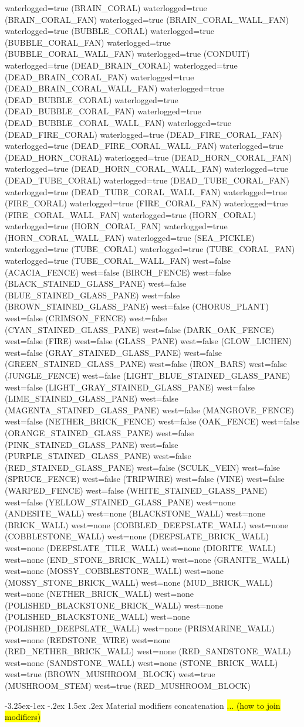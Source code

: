 \documentclass[11pt]{article}
\makeatletter
\renewcommand\subsection{\@startsection{subsection}{2}{\z@}%
                                         {-3.25ex\@plus -1ex \@minus -.2ex}%
                                         {1.5ex \@plus .2ex}%
                                         {\normalfont\fontfamily{phv}\fontsize{14}{17}\bfseries}}
\newcommand\myworries[1]{\sethlcolor{red}\hl{#1}}
\makeatother
\begin{document}
waterlogged=true (BRAIN_CORAL)
waterlogged=true (BRAIN_CORAL_FAN)
waterlogged=true (BRAIN_CORAL_WALL_FAN)
waterlogged=true (BUBBLE_CORAL)
waterlogged=true (BUBBLE_CORAL_FAN)
waterlogged=true (BUBBLE_CORAL_WALL_FAN)
waterlogged=true (CONDUIT)
waterlogged=true (DEAD_BRAIN_CORAL)
waterlogged=true (DEAD_BRAIN_CORAL_FAN)
waterlogged=true (DEAD_BRAIN_CORAL_WALL_FAN)
waterlogged=true (DEAD_BUBBLE_CORAL)
waterlogged=true (DEAD_BUBBLE_CORAL_FAN)
waterlogged=true (DEAD_BUBBLE_CORAL_WALL_FAN)
waterlogged=true (DEAD_FIRE_CORAL)
waterlogged=true (DEAD_FIRE_CORAL_FAN)
waterlogged=true (DEAD_FIRE_CORAL_WALL_FAN)
waterlogged=true (DEAD_HORN_CORAL)
waterlogged=true (DEAD_HORN_CORAL_FAN)
waterlogged=true (DEAD_HORN_CORAL_WALL_FAN)
waterlogged=true (DEAD_TUBE_CORAL)
waterlogged=true (DEAD_TUBE_CORAL_FAN)
waterlogged=true (DEAD_TUBE_CORAL_WALL_FAN)
waterlogged=true (FIRE_CORAL)
waterlogged=true (FIRE_CORAL_FAN)
waterlogged=true (FIRE_CORAL_WALL_FAN)
waterlogged=true (HORN_CORAL)
waterlogged=true (HORN_CORAL_FAN)
waterlogged=true (HORN_CORAL_WALL_FAN)
waterlogged=true (SEA_PICKLE)
waterlogged=true (TUBE_CORAL)
waterlogged=true (TUBE_CORAL_FAN)
waterlogged=true (TUBE_CORAL_WALL_FAN)
west=false (ACACIA_FENCE)
west=false (BIRCH_FENCE)
west=false (BLACK_STAINED_GLASS_PANE)
west=false (BLUE_STAINED_GLASS_PANE)
west=false (BROWN_STAINED_GLASS_PANE)
west=false (CHORUS_PLANT)
west=false (CRIMSON_FENCE)
west=false (CYAN_STAINED_GLASS_PANE)
west=false (DARK_OAK_FENCE)
west=false (FIRE)
west=false (GLASS_PANE)
west=false (GLOW_LICHEN)
west=false (GRAY_STAINED_GLASS_PANE)
west=false (GREEN_STAINED_GLASS_PANE)
west=false (IRON_BARS)
west=false (JUNGLE_FENCE)
west=false (LIGHT_BLUE_STAINED_GLASS_PANE)
west=false (LIGHT_GRAY_STAINED_GLASS_PANE)
west=false (LIME_STAINED_GLASS_PANE)
west=false (MAGENTA_STAINED_GLASS_PANE)
west=false (MANGROVE_FENCE)
west=false (NETHER_BRICK_FENCE)
west=false (OAK_FENCE)
west=false (ORANGE_STAINED_GLASS_PANE)
west=false (PINK_STAINED_GLASS_PANE)
west=false (PURPLE_STAINED_GLASS_PANE)
west=false (RED_STAINED_GLASS_PANE)
west=false (SCULK_VEIN)
west=false (SPRUCE_FENCE)
west=false (TRIPWIRE)
west=false (VINE)
west=false (WARPED_FENCE)
west=false (WHITE_STAINED_GLASS_PANE)
west=false (YELLOW_STAINED_GLASS_PANE)
west=none (ANDESITE_WALL)
west=none (BLACKSTONE_WALL)
west=none (BRICK_WALL)
west=none (COBBLED_DEEPSLATE_WALL)
west=none (COBBLESTONE_WALL)
west=none (DEEPSLATE_BRICK_WALL)
west=none (DEEPSLATE_TILE_WALL)
west=none (DIORITE_WALL)
west=none (END_STONE_BRICK_WALL)
west=none (GRANITE_WALL)
west=none (MOSSY_COBBLESTONE_WALL)
west=none (MOSSY_STONE_BRICK_WALL)
west=none (MUD_BRICK_WALL)
west=none (NETHER_BRICK_WALL)
west=none (POLISHED_BLACKSTONE_BRICK_WALL)
west=none (POLISHED_BLACKSTONE_WALL)
west=none (POLISHED_DEEPSLATE_WALL)
west=none (PRISMARINE_WALL)
west=none (REDSTONE_WIRE)
west=none (RED_NETHER_BRICK_WALL)
west=none (RED_SANDSTONE_WALL)
west=none (SANDSTONE_WALL)
west=none (STONE_BRICK_WALL)
west=true (BROWN_MUSHROOM_BLOCK)
west=true (MUSHROOM_STEM)
west=true (RED_MUSHROOM_BLOCK)

\subsection{Material modifiers concatenation}
\myworries{... (how to join modifiers)}



	
\end{document}
